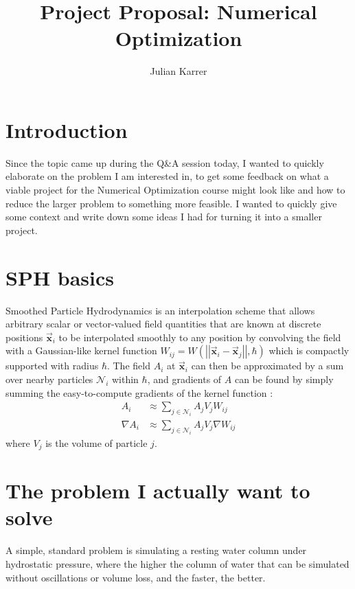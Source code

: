 \documentclass[oneside, a4paper]{book}
\author{Julian Karrer}
\title{Project Proposal: Numerical Optimization}
\newcommand\abss[1]{\left|\left|#1\right|\right|}
\newcommand\vek[1]{\vec{\bm{#1}}}
\newcommand\br[1]{\left(#1\right)}
\begin{document}
\maketitle

\section*{Introduction}
Since the topic came up during the Q\&A session today, I wanted to quickly elaborate on the problem I am interested in, to get some feedback on what a viable project for the Numerical Optimization course might look like and how to reduce the larger problem to something more feasible. I wanted to quickly give some context and write down some ideas I had for turning it into a smaller project.

\section*{SPH basics}
Smoothed Particle Hydrodynamics is an interpolation scheme that allows arbitrary scalar or vector-valued field quantities that are known at discrete positions $\vek{x}_i$ to be interpolated smoothly to any position by convolving the field with a Gaussian-like kernel function $W_{ij}=W\br{\abss{\vek{x}_i - \vek{x}_j}, \hbar}$ which is compactly supported with radius $\hbar$. The field $A_i$ at $\vek{x}_i$ can then be approximated by a sum over nearby particles $\mathcal{N}_i$ within $\hbar$, and gradients of $A$ can be found by simply summing the easy-to-compute gradients of the kernel function \autocite{tutorial2022}:
\begin{align*}
    A_i &\approx \sum_{j\in\mathcal{N}_i} A_j V_j W_{ij}\\
    \nabla A_i &\approx \sum_{j\in\mathcal{N}_i} A_j V_j \nabla W_{ij}
\end{align*}
where $V_j$ is the volume of particle $j$. 

\section*{The problem I actually want to solve}
A simple, standard problem is simulating a resting water column under hydrostatic pressure, where the higher the column of water that can be simulated without oscillations or volume loss, and the faster, the better.\\
\end{document}
